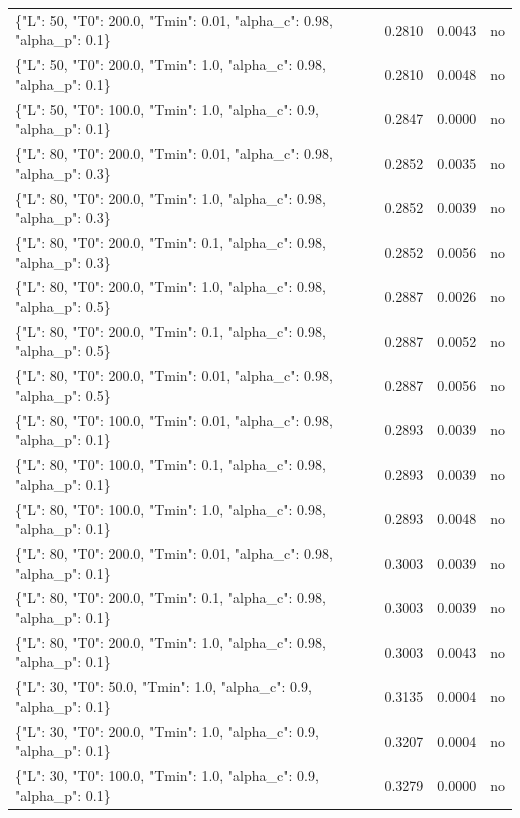 \begin{table}[htbp]
\begin{tabular}{lrrr}
\{"L": 50, "T0": 200.0, "Tmin": 0.01, "alpha\_c": 0.98, "alpha\_p": 0.1\} & 0.2810 & 0.0043 & no \\
\{"L": 50, "T0": 200.0, "Tmin": 1.0, "alpha\_c": 0.98, "alpha\_p": 0.1\} & 0.2810 & 0.0048 & no \\
\{"L": 50, "T0": 100.0, "Tmin": 1.0, "alpha\_c": 0.9, "alpha\_p": 0.1\} & 0.2847 & 0.0000 & no \\
\{"L": 80, "T0": 200.0, "Tmin": 0.01, "alpha\_c": 0.98, "alpha\_p": 0.3\} & 0.2852 & 0.0035 & no \\
\{"L": 80, "T0": 200.0, "Tmin": 1.0, "alpha\_c": 0.98, "alpha\_p": 0.3\} & 0.2852 & 0.0039 & no \\
\{"L": 80, "T0": 200.0, "Tmin": 0.1, "alpha\_c": 0.98, "alpha\_p": 0.3\} & 0.2852 & 0.0056 & no \\
\{"L": 80, "T0": 200.0, "Tmin": 1.0, "alpha\_c": 0.98, "alpha\_p": 0.5\} & 0.2887 & 0.0026 & no \\
\{"L": 80, "T0": 200.0, "Tmin": 0.1, "alpha\_c": 0.98, "alpha\_p": 0.5\} & 0.2887 & 0.0052 & no \\
\{"L": 80, "T0": 200.0, "Tmin": 0.01, "alpha\_c": 0.98, "alpha\_p": 0.5\} & 0.2887 & 0.0056 & no \\
\{"L": 80, "T0": 100.0, "Tmin": 0.01, "alpha\_c": 0.98, "alpha\_p": 0.1\} & 0.2893 & 0.0039 & no \\
\{"L": 80, "T0": 100.0, "Tmin": 0.1, "alpha\_c": 0.98, "alpha\_p": 0.1\} & 0.2893 & 0.0039 & no \\
\{"L": 80, "T0": 100.0, "Tmin": 1.0, "alpha\_c": 0.98, "alpha\_p": 0.1\} & 0.2893 & 0.0048 & no \\
\{"L": 80, "T0": 200.0, "Tmin": 0.01, "alpha\_c": 0.98, "alpha\_p": 0.1\} & 0.3003 & 0.0039 & no \\
\{"L": 80, "T0": 200.0, "Tmin": 0.1, "alpha\_c": 0.98, "alpha\_p": 0.1\} & 0.3003 & 0.0039 & no \\
\{"L": 80, "T0": 200.0, "Tmin": 1.0, "alpha\_c": 0.98, "alpha\_p": 0.1\} & 0.3003 & 0.0043 & no \\
\{"L": 30, "T0": 50.0, "Tmin": 1.0, "alpha\_c": 0.9, "alpha\_p": 0.1\} & 0.3135 & 0.0004 & no \\
\{"L": 30, "T0": 200.0, "Tmin": 1.0, "alpha\_c": 0.9, "alpha\_p": 0.1\} & 0.3207 & 0.0004 & no \\
\{"L": 30, "T0": 100.0, "Tmin": 1.0, "alpha\_c": 0.9, "alpha\_p": 0.1\} & 0.3279 & 0.0000 & no \\
\bottomrule
\end{tabular}
\end{table}

